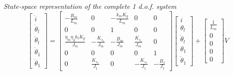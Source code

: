 \textit{State-space representation of the complete 1 d.o.f. system}
\begin{equation}
	\begin{bmatrix}
		\dot{i} \\
		\dot{\theta}_l \\
		\ddot{\theta}_l \\
		\dot{\theta}_1 \\
		\ddot{\theta}_1
	\end{bmatrix}
	=
	\begin{bmatrix}
		-\frac{R_m}{L_m} & 0 & -\frac{k_m K_g}{L_m} & 0 & 0 \\
		0 & 0 &1 & 0 & 0 \\
		\frac{\eta_m \eta_g k_t K_g}{J_m} & -\frac{K_{s_1}}{J_m} & -\frac{B_m}{J_m} & \frac{K_{s_1}}{J_m} & 0 \\
		0 & 0 & 0 & 0 & 1 \\
		0 & \frac{K_{s_1}}{J_1} & 0 & -\frac{K_{s_1}}{J_1} & -\frac{B_1}{J_1}
	\end{bmatrix}
	\begin{bmatrix}
		i \\
		\theta_l \\
		\dot{\theta}_l \\
		\theta_1 \\
		\dot{\theta}_1
	\end{bmatrix}
	+
	\begin{bmatrix}
		\frac{1}{L_m} \\
		0 \\
		0 \\
		0 \\
		0
	\end{bmatrix}
	V
\end{equation}

